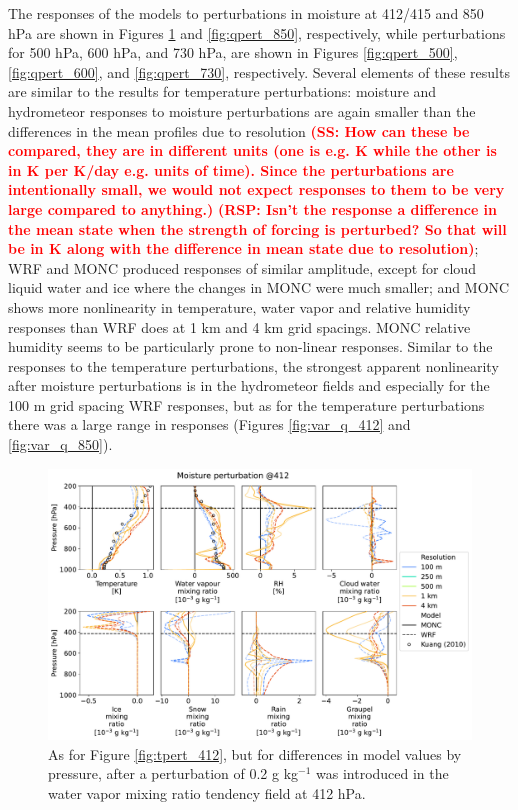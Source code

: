 \documentclass[draft]{agujournal2019}
\newcommand{\todo}[1]{\textcolor{red}{\textbf{(#1)}}}
\begin{document}
The responses of the models to perturbations in moisture at 412/415 and 850 hPa
are shown in Figures \ref{fig:qpert_412} and \ref{fig:qpert_850}, respectively,
while perturbations for 500 hPa, 600 hPa, and 730 hPa, are shown in Figures
\ref{fig:qpert_500}, \ref{fig:qpert_600}, and \ref{fig:qpert_730}, respectively.
Several elements of these results are similar to the results for temperature
perturbations: moisture and hydrometeor responses to moisture perturbations are
again smaller than the differences in the mean profiles due to resolution
\todo{SS: How can these be compared, they are in different units (one is e.g. K
while the other is in K per K/day e.g. units of time).   Since the perturbations
are intentionally small, we would not expect responses to them to be very large
compared to anything.} \todo{RSP: Isn't the response a difference in the mean
state when the strength of forcing is perturbed? So that will be in K along with
the difference in mean state due to resolution}; WRF and MONC produced responses
of similar amplitude, except for cloud liquid water and ice where the changes in
MONC were much smaller; and MONC shows more nonlinearity in temperature, water
vapor and relative humidity responses than WRF does at 1 km and 4 km grid
spacings. MONC relative humidity seems to be particularly prone to non-linear
responses. Similar to the responses to the temperature perturbations, the
strongest apparent nonlinearity after moisture perturbations is in the
hydrometeor fields and especially for the 100 m grid spacing WRF responses, but
as for the temperature perturbations there was a large range in responses
(Figures \ref{fig:var_q_412} and \ref{fig:var_q_850}).

\begin{figure}[pth]
    \noindent\includegraphics[width=\textwidth]{figures/pert_diffs_q_0.0002_@412}
    \caption{As for Figure \ref{fig:tpert_412}, but for differences in model
    values by pressure, after a perturbation of 0.2 g kg$^{-1}$ was introduced
    in the water vapor mixing ratio tendency field at 412 hPa.}
    \label{fig:qpert_412}
\end{figure}
\end{document}
